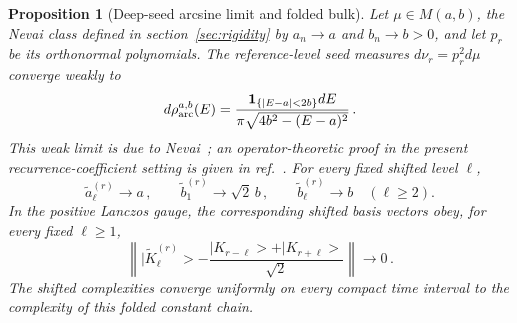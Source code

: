 \documentclass[a4paper,11pt]{article}
\def\ket#1{|#1>}%
\def\dd{d}%
\newtheorem{proposition}{Proposition}[section]
\theoremstyle{definition}
\theoremstyle{remark}
\newcommand{\ket}[1]{|#1\rangle}
\newcommand{\dd}{\mathrm d}
\begin{document}
\begin{proposition}[Deep-seed arcsine limit and folded bulk]
\label{prop:deep-seed-folded-bulk-app}
Let $\mu\in M(a,b)$, the Nevai class defined in section~\ref{sec:rigidity} by
$a_n\to a$ and $b_n\to b>0$,
and let $p_r$ be its orthonormal polynomials.  The reference-level seed
measures $\dd\nu_r=p_r^2\dd\mu$ converge weakly to
\begin{equation}
   \dd\rho_{\rm arc}^{a,b}(E)
   =\frac{\boldsymbol 1_{\{|E-a|<2b\}}\dd E}
          {\pi\sqrt{4b^2-(E-a)^2}}\,.
   \label{eq:deep-seed-arcsine-app}
\end{equation}
This weak limit is due to Nevai~\cite{Nevai1979}; an operator-theoretic proof in the present recurrence-coefficient setting is given in ref.~\cite{VanAssche1995}.
For every fixed shifted level $\ell$,
\begin{equation}
   \widetilde a_\ell^{(r)}\longrightarrow a\,,
   \qquad
   \widetilde b_1^{(r)}\longrightarrow\sqrt2\,b\,,
   \qquad
   \widetilde b_\ell^{(r)}\longrightarrow b\quad(\ell\ge2).
   \label{eq:deep-seed-folded-Jacobi-app}
\end{equation}
In the positive Lanczos gauge, the corresponding shifted basis vectors obey, for every fixed
$\ell\ge1$,
\begin{equation}
   \left\|
      \ket{\widetilde K_\ell^{(r)}}
      -\frac{\ket{K_{r-\ell}}+\ket{K_{r+\ell}}}{\sqrt2}
   \right\|\longrightarrow0\,.
   \label{eq:deep-seed-folded-basis-app}
\end{equation}
The shifted complexities converge uniformly on every compact time interval to the complexity of
this folded constant chain.
\end{proposition}
\end{document}
